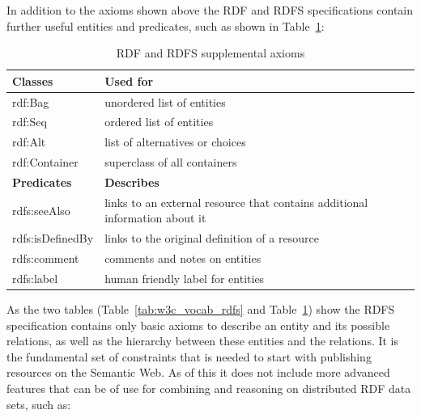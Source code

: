 In addition to the axioms shown above the \gls{RDF} and \gls{RDFS} specifications contain further useful entities and predicates, such as shown in Table~\ref{tab:w3c_vocab_supplement}: \@

\begin{table}[H]
\centering
\begin{tabular}{p{5cm}p{7cm}}
\hline
\textbf{Classes} & \textbf{Used for} \\
\hline
rdf:Bag & unordered list of entities \\
\hline
rdf:Seq & ordered list of entities \\
\hline
rdf:Alt & list of alternatives or choices \\
\hline
rdf:Container & superclass of all containers \\
\hline
\textbf{Predicates} & \textbf{Describes} \\
\hline
rdfs:seeAlso &	links to an external resource that contains additional information about it \\
\hline
rdfs:isDefinedBy & links to the original definition of a resource \\
\hline
rdfs:comment & comments and notes on entities \\
\hline
rdfs:label & human friendly label for entities \\
\hline
\end{tabular}
\caption[\gls{RDF} and \gls{RDFS} supplemental axioms]{\gls{RDF} and \gls{RDFS} supplemental axioms \citep[pg. 46-49]{antoniou2012semantic}}
\label{tab:w3c_vocab_supplement}
\end{table}

As the two tables (Table~\ref{tab:w3c_vocab_rdfs} and Table~\ref{tab:w3c_vocab_supplement}) show the \gls{RDFS} specification contains only basic axioms to describe an entity and its possible relations, as well as the hierarchy between these entities and the relations. It is the fundamental set of constraints that is needed to start with publishing resources on the Semantic Web. As of this it does not include more advanced features that can be of use for combining and reasoning on distributed \gls{RDF} data sets, such as: \@

